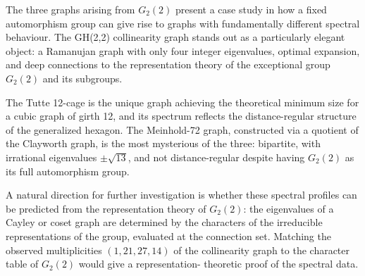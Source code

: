 \documentclass[11pt,a4paper]{article}
\theoremstyle{plain}
\theoremstyle{definition}
\theoremstyle{remark}
\begin{document}
The three graphs arising from $G_2(2)$ present a case study in how a fixed automorphism
group can give rise to graphs with fundamentally different spectral behaviour.  The GH(2,2)
collinearity graph stands out as a particularly elegant object: a Ramanujan graph with
only four integer eigenvalues, optimal expansion, and deep connections to the representation
theory of the exceptional group $G_2(2)$ and its subgroups.

The Tutte 12-cage is the unique graph achieving the theoretical minimum size for a cubic
graph of girth 12, and its spectrum reflects the distance-regular structure of the
generalized hexagon.  The Meinhold-72 graph, constructed via a quotient of the Clayworth
graph, is the most mysterious of the three: bipartite, with irrational eigenvalues $\pm\sqrt{13}$,
and not distance-regular despite having $G_2(2)$ as its full automorphism group.

A natural direction for further investigation is whether these spectral profiles can be
predicted from the representation theory of $G_2(2)$: the eigenvalues of a Cayley or
coset graph are determined by the characters of the irreducible representations of the group,
evaluated at the connection set.  Matching the observed multiplicities $(1, 21, 27, 14)$
of the collinearity graph to the character table of $G_2(2)$ would give a representation-
theoretic proof of the spectral data.
\end{document}
